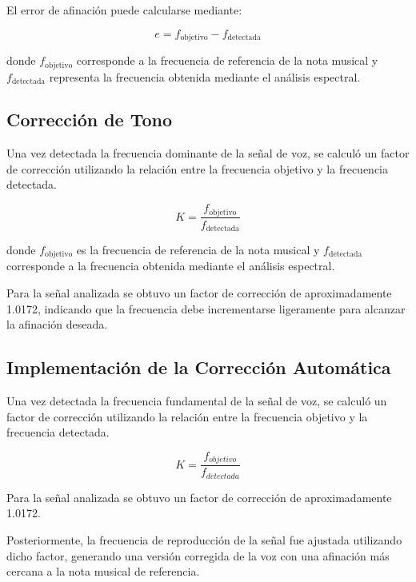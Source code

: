 \documentclass[12pt]{article}
\begin{document}
El error de afinación puede calcularse mediante:

\begin{equation}
e=f_{\text{objetivo}}-f_{\text{detectada}}
\end{equation}

donde \(f_{\text{objetivo}}\) corresponde a la frecuencia de referencia de la nota musical y \(f_{\text{detectada}}\) representa la frecuencia obtenida mediante el análisis espectral.


\subsection{Corrección de Tono}

Una vez detectada la frecuencia dominante de la señal de voz, se calculó un factor de corrección utilizando la relación entre la frecuencia objetivo y la frecuencia detectada.

\begin{equation}
K=\frac{f_{\text{objetivo}}}{f_{\text{detectada}}}
\end{equation}

donde \(f_{\text{objetivo}}\) es la frecuencia de referencia de la nota musical y \(f_{\text{detectada}}\) corresponde a la frecuencia obtenida mediante el análisis espectral.

Para la señal analizada se obtuvo un factor de corrección de aproximadamente 1.0172, indicando que la frecuencia debe incrementarse ligeramente para alcanzar la afinación deseada.


\subsection{Implementación de la Corrección Automática}

Una vez detectada la frecuencia fundamental de la señal de voz, se calculó un factor de corrección utilizando la relación entre la frecuencia objetivo y la frecuencia detectada.

\begin{equation}
K=\frac{f_{objetivo}}{f_{detectada}}
\end{equation}

Para la señal analizada se obtuvo un factor de corrección de aproximadamente 1.0172.

Posteriormente, la frecuencia de reproducción de la señal fue ajustada utilizando dicho factor, generando una versión corregida de la voz con una afinación más cercana a la nota musical de referencia.
\end{document}
